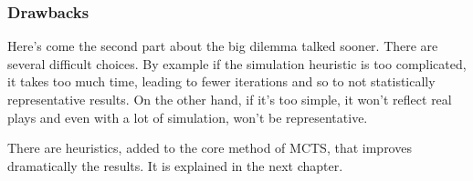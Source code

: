 \subsubsection{Drawbacks}

Here's come the second part about the big dilemma talked sooner.  There are several difficult choices. By example if the simulation heuristic is too complicated, it takes too much time, leading to fewer iterations and so to not statistically representative results. On the other hand, if it's too simple, it won't reflect real plays and even with a lot of simulation, won't be representative. 

There are heuristics, added to the core method of MCTS, that improves dramatically the results. It is explained in the next chapter. 